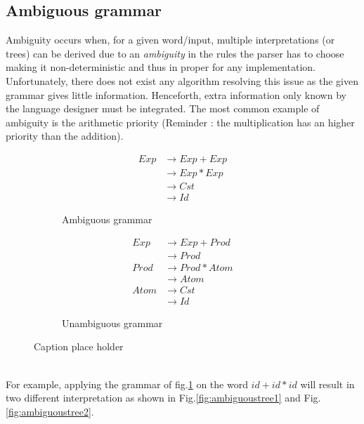 \documentclass[a4paper,11pt]{article}
\begin{document}
  \subsection{Ambiguous grammar}
    \label{sec:ambiguity}
    Ambiguity occurs when, for a given word/input, multiple interpretations (or trees) can be derived due to an \textit{ambiguity} in the rules the parser has to choose making it non-deterministic and thus in proper for any implementation. Unfortunately, there does not exist any algorithm resolving this issue as the given grammar gives little information. Henceforth, extra information only known by the language designer must be integrated. The most common example of ambiguity is the arithmetic priority (Reminder : the multiplication has an higher priority than the addition).
    \begin{figure}[h!]
      \centering
      \begin{subfigure}[b]{0.4\textwidth}
          \centering
          \begin{align}
            Exp &\rightarrow Exp+Exp \\
                &\rightarrow Exp*Exp \\
                &\rightarrow Cst \\
                &\rightarrow Id
          \end{align}
          \caption{Ambiguous grammar}
          \label{fig:unmodifiedgrammar3}
      \end{subfigure}%
      \begin{subfigure}[b]{0.4\textwidth}
          \centering
          \begin{align}
            Exp  &\rightarrow Exp+Prod \\
                 &\rightarrow Prod \\
            Prod &\rightarrow Prod*Atom \\
                 &\rightarrow Atom \\
            Atom &\rightarrow Cst \\
                 &\rightarrow Id
          \end{align}
          \caption{Unambiguous grammar}
          \label{fig:unambiguousgrammar3}
      \end{subfigure}
      \caption{Caption place holder}
\end{figure}\\
  For example, applying the grammar of fig.\ref{fig:unmodifiedgrammar3} on the word $id+id*id$ will result in two different interpretation as shown in Fig.\ref{fig:ambiguoustree1} and Fig.\ref{fig:ambiguoustree2}.
  
\end{document}
